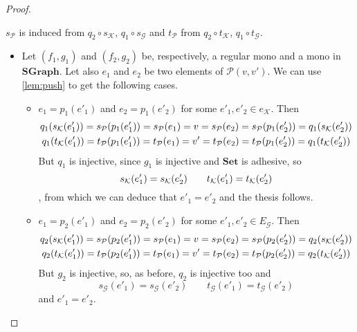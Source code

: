 \documentclass[runningheads,envcountsect]{lmcs}
\newcommand{\dgr}{\catname{SGraph}}
\newcommand{\catname}[1]{\mathbf{#1}}
\theoremstyle{plain}
\theoremstyle{definition}
\begin{document}
\begin{proof}
\begin{center}
	 \end{center}
 $s_\mathcal{P}$ is induced from $q_2\circ s_\mathcal{K}$, $q_1\circ s_\mathcal{G}$ and $t_\mathcal{P}$ from $q_2\circ t_\mathcal{K}$, $q_1\circ t_\mathcal{G}$.
\begin{itemize}
	\item Let $(f_1, g_1)$ and $(f_2, g_2)$ be, respectively, a regular mono and a mono in $\dgr$. Let also $e_1$ and $e_2$ be two elements of $\mathcal{P}(v,v')$. We can use \cref{lem:push} to get the following cases.
	\begin{itemize}
			\item $e_1=p_1(e'_1)$ and $e_2=p_1(e'_2)$ for some $e'_1, e'_2\in e_{\mathcal{K}}$. Then
		\begin{gather*}q_1\qty(s_{\mathcal{K}}\qty(e'_1))=s_{\mathcal{P}}(p_1(e'_1))=s_{\mathcal{P}}(e_1)=v=s_{\mathcal{P}}(e_2)=s_{\mathcal{P}}(p_1(e'_2))=q_1\qty(s_{\mathcal{K}}\qty(e'_2))\\
		q_1\qty(t_{\mathcal{K}}\qty(e'_1))=t_{\mathcal{P}}(p_1(e'_1))=t_{\mathcal{P}}(e_1)=v'=t_{\mathcal{P}}(e_2)=t_{\mathcal{P}}(p_1(e'_2))=q_1\qty(t_{\mathcal{K}}\qty(e'_2))
		\end{gather*}
		But $q_1$ is injective, since $g_1$ is injective and $\catname{Set}$ is adhesive, so 
		\[s_{\mathcal{K}}\qty(e'_1)=s_{\mathcal{K}}\qty(e'_2) \qquad t_{\mathcal{K}}\qty(e'_1)=t_{\mathcal{K}}\qty(e'_2)\], from which we can deduce that $e'_1=e'_2$ and the thesis follows.
		
		\item $e_1=p_2(e'_1)$ and $e_2=p_2(e'_2)$ for some $e'_1, e'_2\in E_{\mathcal{G}}$. Then
		\begin{gather*}q_2\qty(s_{\mathcal{K}}\qty(e'_1))=s_{\mathcal{P}}(p_2(e'_1))=s_{\mathcal{P}}(e_1)=v=s_{\mathcal{P}}(e_2)=s_{\mathcal{P}}(p_2(e'_2))=q_2\qty(s_{\mathcal{K}}\qty(e'_2))\\
		q_2\qty(t_{\mathcal{K}}\qty(e'_1))=t_{\mathcal{P}}(p_2(e'_1))=t_{\mathcal{P}}(e_1)=v'=t_{\mathcal{P}}(e_2)=t_{\mathcal{P}}(p_2(e'_2))=q_2\qty(t_{\mathcal{K}}\qty(e'_2))
		\end{gather*}
		But $g_2$ is injective, so, as before, $q_2$ is injective too and 
		\[s_{\mathcal{G}}(e'_1)=s_{\mathcal{G}}(e'_2) \qquad t_{\mathcal{G}}(e'_1)=t_{\mathcal{G}}(e'_2)\]
		and $e'_1=e'_2$.
		

\end{itemize}
\end{itemize}
\end{proof}
\end{document}
